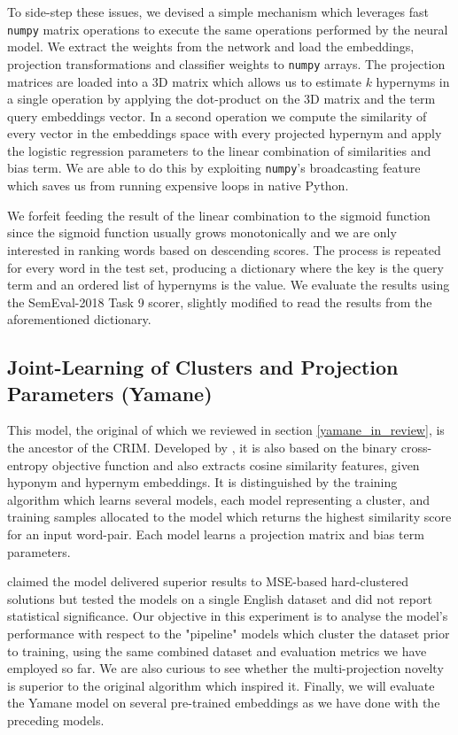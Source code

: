 To side-step these issues, we devised a simple mechanism which leverages fast \texttt{numpy} matrix operations to execute the same operations performed by the neural model.  We extract the weights from the network and load the embeddings, projection transformations and classifier weights to \texttt{numpy} arrays.  The projection matrices are loaded into a 3D matrix which allows us to estimate $k$ hypernyms in a single operation by applying the dot-product on the 3D matrix and the term query embeddings vector.  In a second operation we compute the similarity of every vector in the embeddings space with every projected hypernym and apply the logistic regression parameters to the linear combination of similarities and bias term.  We are able to do this by exploiting \texttt{numpy}'s broadcasting feature which saves us from running expensive loops in native Python.  

We forfeit feeding the result of the linear combination to the sigmoid function since the sigmoid function usually grows monotonically and we are only interested in ranking words based on descending scores.  The process is repeated for every word in the test set, producing a dictionary where the key is the query term and an ordered list of hypernyms is the value.  We evaluate the results using the SemEval-2018 Task 9 scorer, slightly modified to read the results from the aforementioned dictionary.

\subsection{Joint-Learning of Clusters and Projection Parameters (Yamane)}
This model, the original of which we reviewed in section \ref{yamane_in_review}, is the ancestor of the CRIM.  Developed by \citet{yamane2016distributional}, it is also based on the binary cross-entropy objective function and also extracts cosine similarity features, given hyponym and hypernym embeddings.  It is distinguished by the training algorithm which learns several models, each model representing a cluster, and training samples allocated to the model which returns the highest similarity score for an input word-pair.  Each model learns a projection matrix and bias term parameters.

\citet{yamane2016distributional} claimed the model delivered superior results to \ac{MSE}-based hard-clustered solutions but tested the models on a single English dataset and did not report statistical significance.  Our objective in this experiment is to analyse the model's performance with respect to the "pipeline" models which cluster the dataset prior to training, using the same combined dataset and evaluation metrics we have employed so far.  We are also curious to see whether the multi-projection novelty is superior to the original algorithm which inspired it.  Finally, we will evaluate the Yamane model on several pre-trained embeddings as we have done with the preceding models.  

